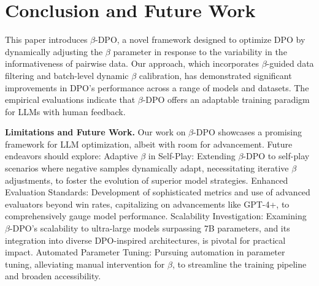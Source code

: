 \section{Conclusion and Future Work}
\label{conclusion}
This paper introduces $\beta$-DPO, a novel framework designed to optimize DPO by dynamically adjusting the $\beta$ parameter in response to the variability in the informativeness of pairwise data. Our approach, which incorporates $\beta$-guided data filtering and batch-level dynamic $\beta$ calibration, has demonstrated significant improvements in DPO's performance across a range of models and datasets. The empirical evaluations indicate that $\beta$-DPO offers an adaptable training paradigm for LLMs with human feedback.

\textbf{Limitations and Future Work.}
Our work on $\beta$-DPO showcases a promising framework for LLM optimization, albeit with room for advancement. Future endeavors should explore:
Adaptive $\beta$ in Self-Play: Extending $\beta$-DPO to self-play scenarios \cite{spin,sppo} where negative samples dynamically adapt, necessitating iterative $\beta$ adjustments, to foster the evolution of superior model strategies.
Enhanced Evaluation Standards: Development of sophisticated metrics and use of advanced evaluators beyond win rates, capitalizing on advancements like GPT-4+, to comprehensively gauge model performance.
Scalability Investigation: Examining $\beta$-DPO's scalability to ultra-large models surpassing 7B parameters, and its integration into diverse DPO-inspired architectures, is pivotal for practical impact.
Automated Parameter Tuning: Pursuing automation in parameter tuning, alleviating manual intervention for $\beta$, to streamline the training pipeline and broaden accessibility.
